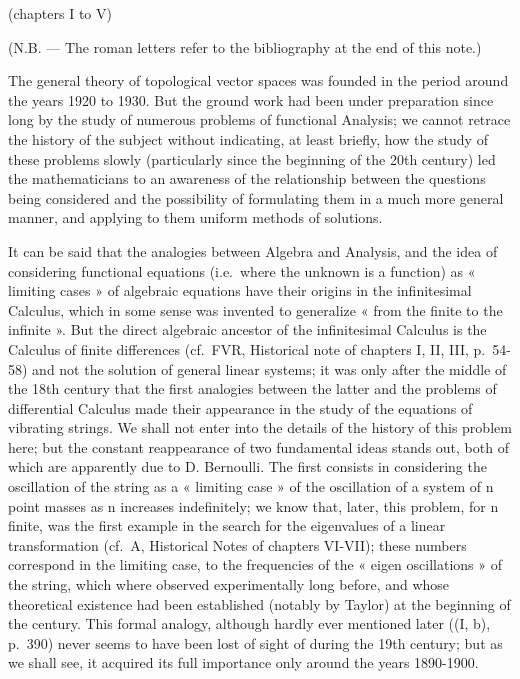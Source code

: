 \backmatter
{}

(chapters I to V)

(N.B. --- The roman letters refer to the bibliography at the end of this note.)

The general theory of topological vector spaces was founded in the period around the years 1920 to 1930. But the ground work had been under preparation since long by the study of numerous problems of functional Analysis; we cannot retrace the history of the subject without indicating, at least briefly, how the study of these problems slowly (particularly since the beginning of the 20th century) led the mathematicians to an awareness of the relationship between the questions being considered and the possibility of formulating them in a much more general manner, and applying to them uniform methods of solutions.

It can be said that the analogies between Algebra and Analysis, and the idea of considering functional equations (i.e.~where the unknown is a function) as « limiting cases » of algebraic equations have their origins in the infinitesimal Calculus, which in some sense was invented to generalize « from the finite to the infinite ». But the direct algebraic ancestor of the infinitesimal Calculus is the Calculus of finite differences (cf.~FVR, Historical note of chapters I, II, III, p.~54-58) and not the solution of general linear systems; it was only after the middle of the 18th century that the first analogies between the latter and the problems of differential Calculus made their appearance in the study of the equations of vibrating strings. We shall not enter into the details of the history of this problem here; but the constant reappearance of two fundamental ideas stands out, both of which are apparently due to D. Bernoulli. The first consists in considering the oscillation of the string as a « limiting case » of the oscillation of a system of n point masses as n increases indefinitely; we know that, later, this problem, for n finite, was the first example in the search for the eigenvalues of a linear transformation (cf.~A, Historical Notes of chapters VI-VII); these numbers correspond in the limiting case, to the frequencies of the « eigen oscillations » of the string, which where observed experimentally long before, and whose theoretical existence had been established (notably by Taylor) at the beginning of the century. This formal analogy, although hardly ever mentioned later ((I, b), p.~390) never seems to have been lost of sight of during the 19th century; but as we shall see, it acquired its full importance only around the years 1890-1900.

